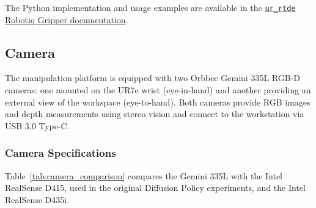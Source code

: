 \documentclass[11pt,a4paper]{article}
\begin{document}
The Python implementation and usage examples are available in the \href{https://sdurobotics.gitlab.io/ur_rtde/pages/core_concepts/guides/use_with_robotiq_gripper.html}{\texttt{ur\_rtde} Robotiq Gripper documentation}.




\subsection{Camera}
\label{sec:camera}

The manipulation platform is equipped with two Orbbec Gemini 335L RGB-D cameras: one mounted on the UR7e wrist (eye-in-hand) and another providing an external view of the workspace (eye-to-hand). Both cameras provide RGB images and depth measurements using stereo vision and connect to the workstation via USB 3.0 Type-C.

\subsubsection{Camera Specifications}

Table~\ref{tab:camera_comparison} compares the Gemini 335L with the Intel RealSense D415, used in the original Diffusion Policy experiments, and the Intel RealSense D435i.
\end{document}
